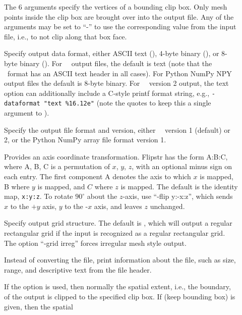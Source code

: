 \begin{description}
\item[]
  The 6 arguments specify the vertices of a bounding clip box.  Only mesh
  points inside the clip box are brought over into the output file.  Any
  of the arguments may be set to ``-'' to use the corresponding value
  from the input file, i.e., to not clip along that box face.
\item[]
  Specify output data format, either ASCII text (), 4-byte
  binary (), or 8-byte binary (). For \OOMMF\ \OVF\ output
  files, the default is text (note that the \OVF\ format has an ASCII
  text header in all cases). For Python NumPy NPY output files the
  default is 8-byte binary. For \OOMMF\ \OVF\ version 2 output, the text
  option can additionally include a C-style printf format string, e.g.,
  \verb|-dataformat "text %16.12e"| (note the quotes to keep this a single
  argument to ).
\item[]
  Specify the output file format and version, either
  \OOMMF\ \OVF\ version 1 (default) or 2, or the Python NumPy array
  file format version 1.
\item[]
  Provides an axis coordinate transformation.  Flipstr has the form
  A:B:C, where A, B, C is a permutation of $x$, $y$, $z$, with an
  optional minus sign on each entry.  The first component A denotes the
  axis to which $x$ is mapped, B where $y$ is mapped, and $C$ where $z$
  is mapped.  The default is the identity map, {\tt x:y:z}.  To rotate
  $90^\circ$ about the $z$-axis, use ``-flip y:-x:z'', which sends $x$
  to the $+y$ axis, $y$ to the -$x$ axis, and leaves $z$ unchanged.
\item[]
  Specify output grid structure.  The default is ,
  which will output a regular rectangular grid if the input is recognized
  as a regular rectangular grid.  The option ``-grid irreg'' forces
  irregular mesh style output.
\item[]
  Instead of converting the file, print information about the file, such
  as size, range, and descriptive text from the file header.
\item[]
  If the  option is used, then normally the spatial extent,
  i.e., the boundary, of the output is clipped to the specified clip
  box.  If  (keep bounding box) is given, then the spatial

\end{description}
